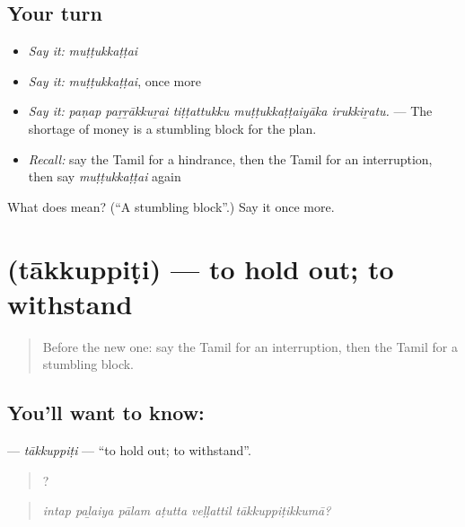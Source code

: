 \subsection*{Your turn}
\begin{itemize}
\raggedright
  \item \emph{Say it:} \emph{muṭṭukkaṭṭai}
  \item \emph{Say it:} \emph{muṭṭukkaṭṭai}, once more
  \item \emph{Say it:} \emph{paṇap paṟṟākkuṟai tiṭṭattukku muṭṭukkaṭṭaiyāka irukkiṟatu.} — The shortage of money is a stumbling block for the plan.
  \item \emph{Recall:} say the Tamil for a hindrance, then the Tamil for an interruption, then say \emph{muṭṭukkaṭṭai} again
\end{itemize}

\begin{tcolorbox}[breakable,colback=teal!4,colframe=teal!35!black,title={Before you move on}]
What does  mean? (\textquotedblleft{}A stumbling block\textquotedblright{}.) Say it once more.
\end{tcolorbox}
\section[\texorpdfstring{\ta{தாக்குப்பிடி} (tākkuppiṭi)}{தாக்குப்பிடி (tākkuppiṭi)}]{ (tākkuppiṭi) — to hold out; to withstand}

\label{lesson:TA-C546-takkuppiti}



\begin{quote}
Before the new one: say the Tamil for an interruption, then the Tamil for a stumbling block.
\end{quote}

\subsection*{You'll want to know: }
\textbf{} — \emph{tākkuppiṭi} — \textquotedblleft{}to hold out; to withstand\textquotedblright{}.

\begin{quote}
     ?
\end{quote}

\begin{quote}
\emph{intap paḻaiya pālam aṭutta veḷḷattil tākkuppiṭikkumā?}
\end{quote}

